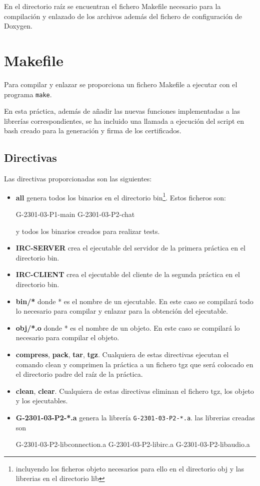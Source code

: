 \documentclass{mathnotes}
\begin{document}
En el directorio raíz se encuentran el fichero Makefile necesario para la compilación y enlazado de los archivos además del fichero de configuración de Doxygen.

\section{Makefile}
Para compilar y enlazar se proporciona un fichero Makefile a ejecutar con el programa \texttt{make}.

En esta práctica, además de añadir las nuevas funciones implementadas a las librerías correspondientes, se ha incluido una llamada a ejecución del script en bash creado para la generación y firma de los certificados.

\subsection{Directivas}
Las directivas proporcionadas son las siguientes:

\begin{itemize}
\item \textbf{all} genera todos los binarios en el directorio bin\footnote{incluyendo los ficheros objeto necesarios para ello en el directorio obj y las librerias en el directorio lib}. Estos ficheros son:

\subitem G-2301-03-P1-main
\subitem G-2301-03-P2-chat

y todos los binarios creados para realizar tests.

\item \textbf{IRC-SERVER} crea el ejecutable del servidor de la primera práctica en el directorio bin.

\item \textbf{IRC-CLIENT} crea el ejecutable del cliente de la segunda práctica en el directorio bin.

\item \textbf{bin/*} donde * es el nombre de un ejecutable. En este caso se compilará todo lo necesario para compilar y enlazar para la obtención del ejecutable.

\item \textbf{obj/*.o} donde * es el nombre de un objeto. En este caso se compilará lo necesario para compilar el objeto.

\item \textbf{compress}, \textbf{pack}, \textbf{tar}, \textbf{tgz}. Cualquiera de estas directivas ejecutan el comando clean y comprimen la práctica a un fichero tgz que será colocado en el directorio padre del raíz de la práctica.

\item \textbf{clean}, \textbf{clear}. Cualquiera de estas directivas eliminan el fichero tgz, los objeto y los ejecutables.

\item\textbf{G-2301-03-P2-*.a} genera la librería \texttt{G-2301-03-P2-*.a}.
las librerias creadas son

\subitem G-2301-03-P2-libconnection.a
\subitem G-2301-03-P2-libirc.a
\subitem G-2301-03-P2-libaudio.a
\end{itemize}
\end{document}
